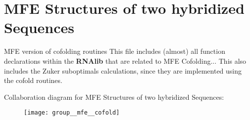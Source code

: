 \hypertarget{group__mfe__cofold}{}\section{M\+FE Structures of two hybridized Sequences}
\label{group__mfe__cofold}


M\+FE version of cofolding routines This file includes (almost) all function declarations within the {\bfseries R\+N\+Alib} that are related to M\+FE Cofolding... This also includes the Zuker suboptimals calculations, since they are implemented using the cofold routines.  


Collaboration diagram for M\+FE Structures of two hybridized Sequences\+:
\nopagebreak
\begin{figure}[H]
\begin{center}
\leavevmode
\texttt{[image: group\_\_mfe\_\_cofold]}
\end{center}
\end{figure}
